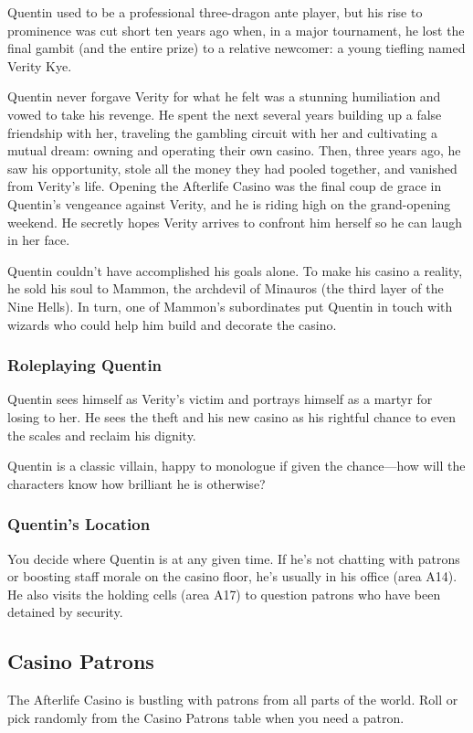 \documentclass[10pt,a4paper,twoside,bg=print,twocolumn,openany,nodeprecatedcode]{dndbook}
\begin{document}
Quentin used to be a professional three-dragon ante player, but his rise to prominence was cut short ten years ago when, in a major tournament, he lost the final gambit (and the entire prize) to a relative newcomer: a young tiefling named Verity Kye.

Quentin never forgave Verity for what he felt was a stunning humiliation and vowed to take his revenge. He spent the next several years building up a false friendship with her, traveling the gambling circuit with her and cultivating a mutual dream: owning and operating their own casino. Then, three years ago, he saw his opportunity, stole all the money they had pooled together, and vanished from Verity's life. Opening the Afterlife Casino was the final coup de grace in Quentin's vengeance against Verity, and he is riding high on the grand-opening weekend. He secretly hopes Verity arrives to confront him herself so he can laugh in her face.

Quentin couldn't have accomplished his goals alone. To make his casino a reality, he sold his soul to Mammon, the archdevil of Minauros (the third layer of the Nine Hells). In turn, one of Mammon's subordinates put Quentin in touch with wizards who could help him build and decorate the casino.

\subsubsection{Roleplaying Quentin}
Quentin sees himself as Verity's victim and portrays himself as a martyr for losing to her. He sees the theft and his new casino as his rightful chance to even the scales and reclaim his dignity.

Quentin is a classic villain, happy to monologue if given the chance—how will the characters know how brilliant he is otherwise?

\subsubsection{Quentin's Location}
You decide where Quentin is at any given time. If he's not chatting with patrons or boosting staff morale on the casino floor, he's usually in his office (area A14). He also visits the holding cells (area A17) to question patrons who have been detained by security.

\subsection{Casino Patrons}
The Afterlife Casino is bustling with patrons from all parts of the world. Roll or pick randomly from the Casino Patrons table when you need a patron.
\end{document}
